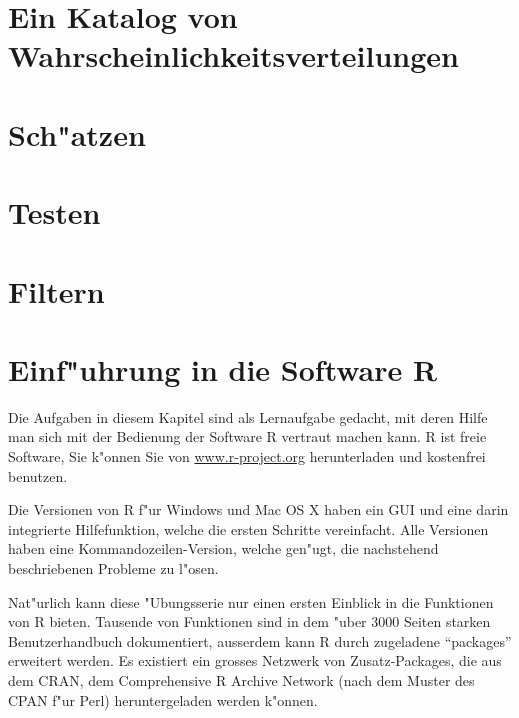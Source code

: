 \documentclass[a4paper,12pt]{book}
\begin{document}
\chapter{Ein Katalog von Wahrscheinlichkeitsverteilungen}

\chapter{Sch"atzen}

\chapter{Testen}

\chapter{Filtern}

\chapter{Einf"uhrung in die Software R}
Die Aufgaben in diesem Kapitel sind als Lernaufgabe gedacht, mit deren
Hilfe man sich mit der Bedienung der Software R vertraut machen kann.
R ist freie Software, Sie k"onnen Sie von \url{www.r-project.org}
herunterladen und kostenfrei benutzen.

Die Versionen von R f"ur Windows und Mac OS X haben ein GUI und eine darin
integrierte Hilfefunktion, welche die ersten Schritte vereinfacht. Alle
Versionen haben eine Kommandozeilen-Version, welche gen"ugt, die nachstehend
beschriebenen Probleme zu l"osen.

Nat"urlich kann diese "Ubungsserie nur einen ersten Einblick in die
Funktionen von R bieten. Tausende von Funktionen sind in dem "uber 3000
Seiten starken Benutzerhandbuch dokumentiert, ausserdem kann R durch
zugeladene ``packages'' erweitert werden. Es existiert ein grosses Netzwerk
von Zusatz-Packages, die aus dem CRAN, dem Comprehensive R Archive
Network (nach dem Muster des CPAN f"ur Perl) heruntergeladen werden
k"onnen.

\bigskip


\end{document}
